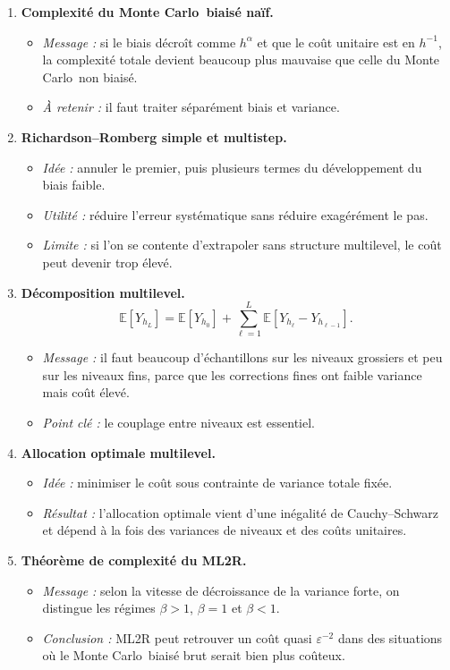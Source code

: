 \documentclass[11pt,a4paper]{article}
\newcommand{\E}{\mathbb{E}}
\newcommand{\mc}{Monte Carlo}
\begin{document}
\begin{enumerate}[label=\textbf{\arabic*.}]
  \item \textbf{Complexité du \mc\ biaisé naïf.}
  \begin{itemize}
    \item \emph{Message :} si le biais décroît comme $h^\alpha$ et que le coût unitaire est en $h^{-1}$, la complexité totale devient beaucoup plus mauvaise que celle du \mc\ non biaisé.
    \item \emph{À retenir :} il faut traiter séparément biais et variance.
  \end{itemize}

  \item \textbf{Richardson--Romberg simple et multistep.}
  \begin{itemize}
    \item \emph{Idée :} annuler le premier, puis plusieurs termes du développement du biais faible.
    \item \emph{Utilité :} réduire l'erreur systématique sans réduire exagérément le pas.
    \item \emph{Limite :} si l'on se contente d'extrapoler sans structure multilevel, le coût peut devenir trop élevé.
  \end{itemize}

  \item \textbf{Décomposition multilevel.}
  \[
    \E[Y_{h_L}] = \E[Y_{h_0}] + \sum_{\ell=1}^{L}\E\!\left[Y_{h_\ell}-Y_{h_{\ell-1}}\right].
  \]
  \begin{itemize}
    \item \emph{Message :} il faut beaucoup d'échantillons sur les niveaux grossiers et peu sur les niveaux fins, parce que les corrections fines ont faible variance mais coût élevé.
    \item \emph{Point clé :} le couplage entre niveaux est essentiel.
  \end{itemize}

  \item \textbf{Allocation optimale multilevel.}
  \begin{itemize}
    \item \emph{Idée :} minimiser le coût sous contrainte de variance totale fixée.
    \item \emph{Résultat :} l'allocation optimale vient d'une inégalité de Cauchy--Schwarz et dépend à la fois des variances de niveaux et des coûts unitaires.
  \end{itemize}

  \item \textbf{Théorème de complexité du ML2R.}
  \begin{itemize}
    \item \emph{Message :} selon la vitesse de décroissance de la variance forte, on distingue les régimes $\beta>1$, $\beta=1$ et $\beta<1$.
    \item \emph{Conclusion :} ML2R peut retrouver un coût quasi $\varepsilon^{-2}$ dans des situations où le \mc\ biaisé brut serait bien plus coûteux.
  \end{itemize}


\end{enumerate}
\end{document}
